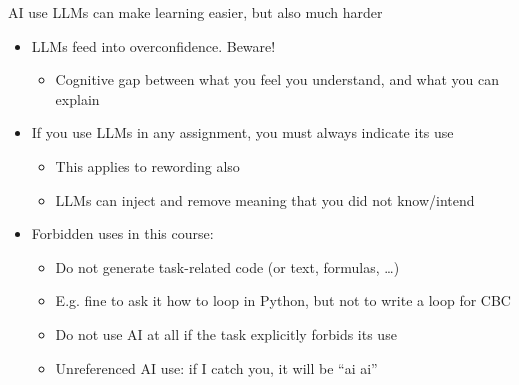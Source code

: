 \begin{frame}{AI use}
  LLMs can make learning easier, but also much harder
  \begin{itemize}
    \pause
    \item LLMs feed into overconfidence. Beware!
    \begin{itemize}
      \item Cognitive gap between what you feel you understand, and what you can explain
    \end{itemize}
    \pause
    \item If you use LLMs in any assignment, you must always indicate its use
    \begin{itemize}
      \item This applies to rewording also
      \item LLMs can inject and remove meaning that you did not know/intend
    \end{itemize}
    \pause
    \item Forbidden uses in this course:
    \begin{itemize}
      \item Do not generate task-related code (or text, formulas, \dots)
      \item E.g. fine to ask it how to loop in Python, but not to write a loop for CBC
      \item Do not use AI at all if the task explicitly forbids its use
      \item Unreferenced AI use: if I catch you, it will be \enquote{ai ai}
    \end{itemize}
  \end{itemize}
\end{frame}

